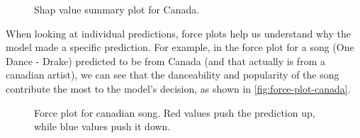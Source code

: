 \documentclass{article}
\begin{document}
\begin{figure}[H]
    \centering
    \noindent
    \caption{Shap value summary plot for Canada.}
    \label{fig:canada}
\end{figure}

When looking at individual predictions, force plots help us understand why the model made a specific prediction. For example, in the force plot for a song (One Dance - Drake) predicted to be from Canada (and that actually is from a canadian artist), we can see that the danceability and popularity of the song contribute the most to the model's decision, as shown in \autoref{fig:force-plot-canada}.\newline

\begin{figure}[H]
    \centering
    \noindent
    \caption{Force plot for canadian song. Red values push the prediction up, while blue values push it down.}
    \label{fig:force-plot-canada}
\end{figure}
\end{document}
